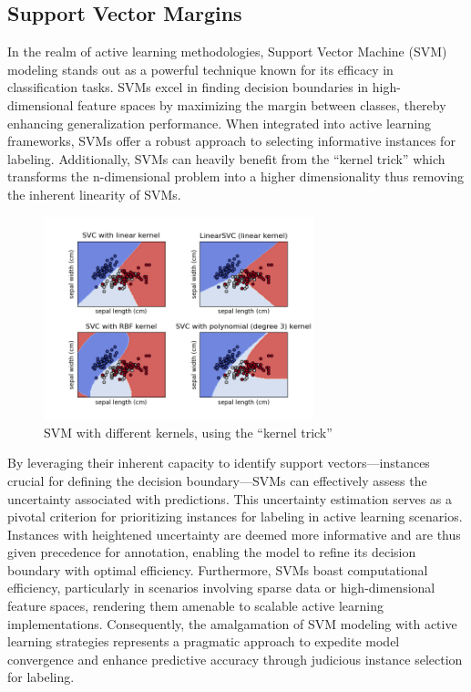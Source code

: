 \documentclass[11pt]{article}
\begin{document}
\subsection{Support Vector Margins}
In the realm of active learning methodologies, Support Vector Machine (SVM) modeling stands out as a powerful technique known for its efficacy in classification tasks. SVMs excel in finding decision boundaries in high-dimensional feature spaces by maximizing the margin between classes, thereby enhancing generalization performance. When integrated into active learning frameworks, SVMs offer a robust approach to selecting informative instances for labeling\cite{kremer_active_2014}. Additionally, SVMs can heavily benefit from the ``kernel trick'' which transforms the n-dimensional problem into a higher dimensionality thus removing the inherent linearity of SVMs.
\begin{figure}[H]
  \centering
  \includegraphics[width=0.7\textwidth]{SVM.png}
  \caption{SVM with different kernels, using the ``kernel trick''}\label{fig:svm}
\end{figure}
By leveraging their inherent capacity to identify support vectors—instances crucial for defining the decision boundary—SVMs can effectively assess the uncertainty associated with predictions. This uncertainty estimation serves as a pivotal criterion for prioritizing instances for labeling in active learning scenarios. Instances with heightened uncertainty are deemed more informative and are thus given precedence for annotation, enabling the model to refine its decision boundary with optimal efficiency. Furthermore, SVMs boast computational efficiency, particularly in scenarios involving sparse data or high-dimensional feature spaces, rendering them amenable to scalable active learning implementations. Consequently, the amalgamation of SVM modeling with active learning strategies represents a pragmatic approach to expedite model convergence and enhance predictive accuracy through judicious instance selection for labeling.
\end{document}
